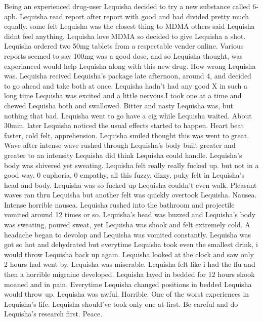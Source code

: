\documentclass[12pt]{book}
\begin{document}
Being an experienced drug-user Lequisha decided to try a new substance called 6-apb. Lequisha read report after report with good and bad divided pretty much equally. some felt Lequisha was the closest thing to MDMA others said Lequisha didnt feel anything. Lequisha love MDMA so decided to give Lequisha a shot. Lequisha ordered two 50mg tablets from a respectable vender online. Various reports seemed to say 100mg was a good dose, and so Lequisha thought, was experianced would help Lequisha along with this new drug. How wrong Lequisha was. Lequisha recived Lequisha's package late afternoon, around 4, and decided to go ahead and take both at once. Lequisha hadn't had any good X in such a long time Lequisha was excited and a little nervous.I took one at a time and chewed Lequisha both and swallowed. Bitter and nasty Lequisha was, but nothing that bad. Lequisha went to go have a cig while Lequisha waited. About 30min. later Lequisha noticed the usual effects started to happen. Heart beat faster, cold felt, apprehension. Lequisha smiled thought this was went to great. Wave after intense wave rushed through Lequisha's body built greater and greater to an intensity Lequisha did think Lequisha could handle. Lequisha's body was shivered yet sweating. Lequisha felt really really fucked up. but not in a good way. 0 euphoria, 0 empathy, all this fuzzy, dizzy, puky felt in Lequisha's head and body. Lequisha was so fucked up Lequisha couldn't even walk. Pleasant waves ran thru Lequisha but another felt was quickly overtook Lequisha. Nausea. Intense horrible nausea. Lequisha rushed into the bathroom and projectile vomited around 12 times or so. Lequisha's head was buzzed and Lequisha's body was sweating, poured sweat, yet Lequisha was shook and felt extremely cold. A headache began to devolop and Lequisha was vomited constantly. Lequisha was got so hot and dehydrated but everytime Lequisha took even the smallest drink, i would throw Lequisha back up again. Lequisha looked at the clock and saw only 2 hours had went by. Lequisha was miserable. Lequisha felt like i had the flu and then a horrible migraine developed. Lequisha layed in bedded for 12 hours shook moaned and in pain. Everytime Lequisha changed positions in bedded Lequisha would throw up. Lequisha was awful. Horrible. One of the worst experiences in Lequisha's life. Lequisha should've took only one at first. Be careful and do Lequisha's research first. Peace.
\end{document}

